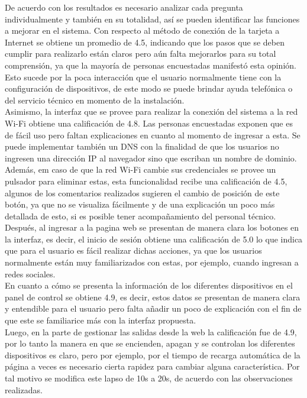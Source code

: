 De acuerdo con los resultados es necesario analizar cada pregunta individualmente y también en su totalidad, así se pueden identificar las funciones a mejorar en el sistema. Con respecto al método de conexión de la tarjeta a Internet se obtiene un promedio de 4.5, indicando que los pasos que se deben cumplir para realizarlo están claros pero aún falta mejorarlos para su total comprensión, ya que la mayoría de personas encuestadas manifestó esta opinión. Esto sucede por la poca interacción que el usuario normalmente tiene con la configuración de dispositivos, de este modo se puede brindar ayuda telefónica o del servicio técnico en momento de la instalación.\\

Asimismo, la interfaz que se provee para realizar la conexión del sistema a la red Wi-Fi obtiene una calificación de 4.8. Las personas encuestadas exponen que es de fácil uso pero faltan explicaciones en cuanto al momento de ingresar a esta. Se puede implementar también un DNS con la finalidad de que los usuarios no ingresen una dirección IP al navegador sino que escriban un nombre de dominio.\\

Además, em caso de que la red Wi-Fi cambie sus credenciales se provee un pulsador para eliminar estas, esta funcionalidad recibe una calificación de 4.5, algunos de los comentarios realizados sugieren el cambio de posición de este botón, ya que no se visualiza fácilmente y de una explicación un poco más detallada de esto, si es posible tener acompañamiento del personal técnico.\\

Después, al ingresar a la pagina web se presentan de manera clara los botones en la interfaz, es decir, el inicio de sesión obtiene una calificación de 5.0 lo que indica que para el usuario es fácil realizar dichas acciones, ya que los usuarios normalmente están muy familiarizados con estas, por ejemplo, cuando ingresan a redes sociales.\\

En cuanto a cómo se presenta la información de los diferentes dispositivos en el panel de control se obtiene 4.9, es decir, estos datos se presentan de manera clara y entendible para el usuario pero falta añadir un poco de explicación con el fin de que este se familiarice más con la interfaz propuesta.\\

Luego, en la parte de gestionar las salidas desde la web la calificación fue de 4.9, por lo tanto la manera en que se encienden, apagan y se controlan los diferentes dispositivos es claro, pero por ejemplo, por el tiempo de recarga automática de la página a veces es necesario cierta rapidez para cambiar alguna característica. Por tal motivo se modifica este lapso de 10s a 20s, de acuerdo con las observaciones realizadas.\\

